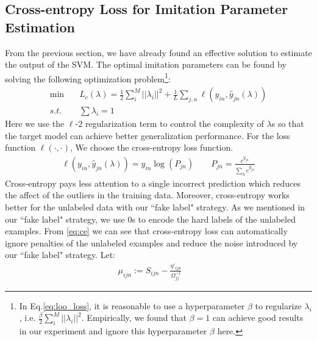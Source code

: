\subsection{Cross-entropy Loss for Imitation Parameter Estimation}
From the previous section, we have already found an effective solution to estimate the output of the SVM. The optimal imitation parameters can be found by solving the following optimization problem\footnote{In Eq.\eqref{eq:loo_loss}, it is reasonable to use a hyperparameter $\beta$ to regularize $\lambda_i$, i.e. $\frac{\beta}{2}\sum_i^M||\lambda_i||^2$. Empirically, we found that $\beta=1$ can achieve good results in our experiment and ignore this hyperparameter $\beta$ here.}:
\begin{equation}\label{eq:loo_loss}
\begin{aligned}
\min \quad& L_c\left(\lambda\right)=\frac{1}{2}\sum_i^M||\lambda_i||^2+\frac{1}{L}\sum_{j,n}\ell\left(y_{in},\hat{y}_{jn}\left(\lambda\right)\right)\\
s.t. \quad& \sum\lambda_i=1
\end{aligned}
\end{equation}
Here we use the $\ell$-2 regularization term to control the complexity of $\lambda$s so that the target model can achieve better generalization performance. For the loss function $\ell(\cdot,\cdot)$, We choose the cross-entropy loss function.
\begin{equation}\label{eq:ce}
\begin{aligned}
\ell\left(y_{in},\hat{y}_{jn}\left(\lambda\right)\right)=y_{in}\log(P_{jn}) \qquad
P_{jn} = \frac{e^{\hat{y}_{jn}}}{\sum_{h} e^{\hat{y}_{jh}}}
\end{aligned}
\end{equation}
Cross-entropy pays less attention to a single incorrect prediction which reduces the affect of the outliers in the training data. Moreover, cross-entropy works better for the unlabeled data with our ``fake label" strategy. As we mentioned in our ``fake label" strategy, we use 0s to encode the hard labels of the unlabeled examples. From \eqref{eq:ce} we can see that cross-entropy loss can automatically ignore penalties of the unlabeled examples and reduce the noise introduced by our ``fake label" strategy. 
Let:
\begin{equation}\label{eq:mu}
\begin{aligned}
\mu_{ijn}:=S_{ijn}-\frac{{\eta}'_{ijn}}{\Omega_{jj}^{-1}} \qquad
\end{aligned}
\end{equation}
